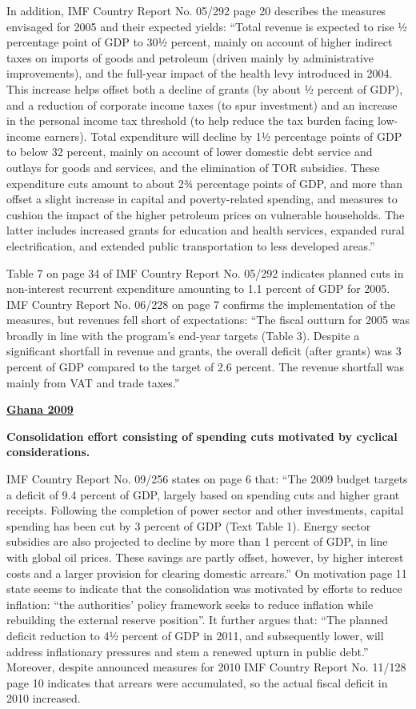 In addition, IMF Country Report No. 05/292 page 20 describes the measures envisaged for 2005 and their expected yields: “Total revenue is  expected to rise ½ percentage point of GDP to 30½ percent, mainly on account of higher indirect taxes on imports of goods and petroleum (driven mainly by administrative improvements), and the full-year impact of the health levy introduced in 2004. This increase helps offset both a decline of grants (by about ½ percent of GDP), and a reduction of corporate income taxes (to spur investment) and an increase in the personal income tax threshold (to help reduce the tax burden facing low-income earners). Total expenditure will decline by 1½ percentage points of GDP to below 32 percent, mainly on account of lower domestic debt service and outlays for goods and services, and the elimination of TOR subsidies. These expenditure cuts amount to about 2¾ percentage points of GDP, and more than offset a slight increase in capital and poverty-related spending, and measures to cushion the impact of the higher petroleum prices on vulnerable households. The latter includes increased grants for education and health services, expanded rural electrification, and extended public transportation to less developed areas.” 

Table 7 on page 34 of IMF Country Report No. 05/292 indicates planned cuts in non-interest recurrent expenditure amounting to 1.1 percent of GDP for 2005. IMF Country Report No. 06/228 on page 7 confirms the implementation of the measures, but revenues fell short of expectations: “The fiscal outturn for 2005 was broadly in line with the program’s end-year targets (Table 3). Despite a significant shortfall in revenue and grants, the overall deficit (after grants) was 3 percent of GDP compared to the target of 2.6 percent. The revenue shortfall was mainly from VAT and trade taxes.”

\textbf{\underline{Ghana 2009}}

\textbf{Consolidation effort consisting of spending cuts motivated by cyclical considerations.}

IMF Country Report No. 09/256 states on page 6 that: “The 2009 budget targets a deficit of 9.4 percent of GDP, largely based on spending cuts and higher grant receipts. Following the completion of power sector and other investments, capital spending has been cut by 3 percent of GDP (Text Table 1). Energy sector subsidies are also projected to decline by more than 1 percent of GDP, in line with global oil prices. These savings are partly offset, however, by higher interest costs and a larger provision for clearing domestic arrears.”
On motivation page 11 state seems to indicate that the consolidation was motivated by efforts to reduce inflation: “the authorities’ policy framework seeks to reduce inflation while rebuilding the external reserve position”. It further argues that: “The planned deficit reduction to 4½ percent of GDP in 2011, and subsequently lower, will address inflationary pressures and stem a renewed upturn in public debt.”
Moreover, despite announced measures for 2010 IMF Country Report No. 11/128 page 10 indicates that arrears were accumulated, so the actual fiscal deficit in 2010 increased.

